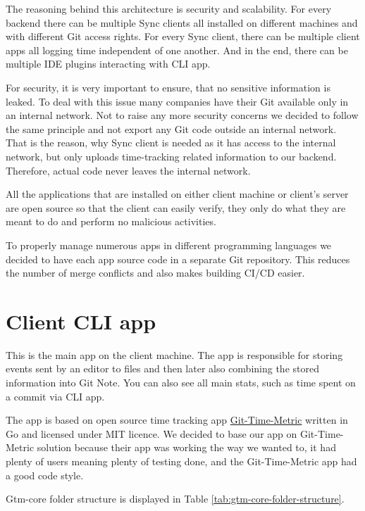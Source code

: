 The reasoning behind this architecture is security and scalability.
For every backend there can be multiple Sync clients all installed on different machines and with different Git access rights.
For every Sync client, there can be multiple client apps all logging time independent of one another.
And in the end, there can be multiple IDE plugins interacting with CLI app.

For security, it is very important to ensure, that no sensitive information is leaked.
To deal with this issue many companies have their Git available only in an internal network.
Not to raise any more security concerns we decided to follow the same principle and not export any Git code outside an internal network.
That is the reason, why Sync client is needed as it has access to the internal network, but only uploads time-tracking related information to our backend.
Therefore, actual code never leaves the internal network.

All the applications that are installed on either client machine or client's server are open source so that the client can easily verify,
they only do what they are meant to do and perform no malicious activities.

To properly manage numerous apps in different programming languages we decided to have each app source code in a separate Git repository.
This reduces the number of merge conflicts and also makes building CI/CD easier.


\section{Client CLI app}\label{sec:cli-app}
This is the main app on the client machine.
The app is responsible for storing events sent by an editor to files and then later also combining the stored information into Git Note.
You can also see all main stats, such as time spent on a commit via CLI app.

The app is based on open source time tracking app \href{https://github.com/git-time-metric/gtm}{Git-Time-Metric} written in Go and licensed under MIT licence.
We decided to base our app on Git-Time-Metric solution because their app was working the way we wanted to, it had plenty of users meaning plenty of testing done,
and the Git-Time-Metric app had a good code style.

Gtm-core folder structure is displayed in Table
\ref{tab:gtm-core-folder-structure}.

